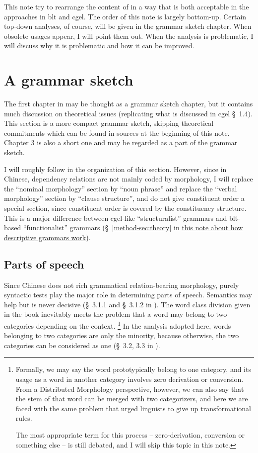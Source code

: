 \documentclass[UTF8, a4paper, oneside, scheme=plain]{ctexart}
\newcommand*{\citesec}[1]{\S~{#1}}
\newcommand{\method}{\href{../methodology/glossing.pdf}{this note about how descriptive grammars work}}
\begin{document}
This note try to rearrange the content of \citet{zhudexigrammar}
in a way that is both acceptable in the approaches in \ac{blt} and \ac{cgel}.
The order of this note is largely bottom-up.
Certain top-down analyses, of course, will be given in the grammar sketch chapter.
When obsolete usages appear, I will point them out.
When the analysis is problematic, I will discuss why it is problematic and how it can be improved.

\section{A grammar sketch}

The first chapter in \citet{zhudexigrammar} may be thought as a grammar sketch chapter,
but it contains much discussion on theoretical issues
(replicating what is discussed in \ac{cgel} \citesec{1.4}).
This section is a more compact grammar sketch,
skipping theoretical commitments which can be found in sources at the beginning of this note.
Chapter 3 is also a short one and may be regarded as a part of the grammar sketch.

I will roughly follow \citet{jacques2021grammar} in the organization of this section.
However, since in Chinese, dependency relations are not mainly coded by morphology,
I will replace the ``nominal morphology'' section by ``noun phrase''
and replace the ``verbal morphology'' section by ``clause structure'',
and do not give constituent order a special section,
since constituent order is covered by the constituency structure.
This is a major difference between \ac{cgel}-like ``structuralist'' grammars 
and \ac{blt}-based ``functionalist'' grammars
(\citesec{\ref{method-sec:theory}} in \method).

\subsection{Parts of speech}

Since Chinese does not rich grammatical relation-bearing morphology,
purely syntactic tests play the major role in determining parts of speech.
Semantics may help but is never decisive 
(\citesec{3.1.1} and \citesec{3.1.2} in \citet{zhudexigrammar}).
The word class division given in the book inevitably meets the problem 
that a word may belong to two categories depending on the context.%
\footnote{
    Formally, we may say the word prototypically belong to one category,
    and its usage as a word in another category
    involves zero derivation or conversion.
    From a Distributed Morphology perspective,
    however, we can also say that the stem of that word can be merged with 
    two categorizers, 
    and here we are faced with the same problem that 
    urged linguists to give up transformational rules.

    The most appropriate term for this process -- 
    zero-derivation, conversion or something else -- is still debated,
    and I will skip this topic in this note.
}
In the analysis adopted here, words belonging to two categories are only the minority,
because otherwise, the two categories can be considered as one 
(\citesec{3.2, 3.3} in \citet{zhudexigrammar}).
\end{document}

